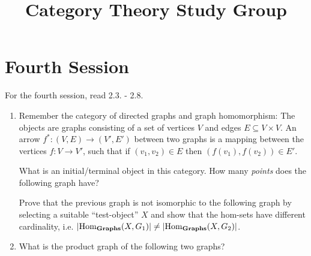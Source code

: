 \documentclass{scrartcl}
\title{Category Theory Study Group}
\date{}
\begin{document}
\maketitle

\section*{Fourth Session}
For the fourth session, read 2.3. - 2.8.

\begin{enumerate}
\item
  Remember the category of directed graphs and graph homomorphism:
  The objects are graphs consisting of a set of vertices $V$ and edges $E \subseteq V \times V$.
  An arrow $f^*: (V,E) \rightarrow (V',E')$ between two graphs is a mapping between the vertices $f:V \rightarrow V'$, such that if $(v_1,v_2) \in E$ then $(f(v_1),f(v_2)) \in E'$.
  
  What is an initial/terminal object in this category.
  How many \emph{points} does the following graph have?
  \begin{center}
  \end{center}

  Prove that the previous graph is not isomorphic to the following graph by selecting a suitable ``test-object'' $X$ and show that the hom-sets have different cardinality, i.e. $|\mathrm{Hom}_{\mathbf{Graphs}}(X,G_1)| \neq |\mathrm{Hom}_{\mathbf{Graphs}}(X,G_2)|$.
  \begin{center}
  \end{center}

\item What is the product graph of the following two graphs?
  \begin{center}
  \end{center}


\end{enumerate}
\end{document}
